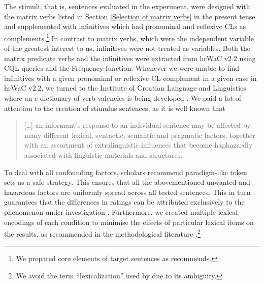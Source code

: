 The stimuli, that is, sentences evaluated in the experiment, were designed with the matrix verbs listed in Section \ref{Selection of matrix verbs} in the present tense and supplemented with infinitives which had pronominal and reflexive CLs as complements.\footnote{We prepared core elements of target sentences as \citet[][50]{Cowart97} recommends. } In contrast to matrix verbs, which were the independent variable of the greatest interest to us, infinitives were not treated as variables. Both the matrix predicate verbs and the infinitives were extracted from hrWaC v2.2 using CQL queries and the Frequency function. Whenever we were unable to find infinitives with a given pronominal or reflexive CL complement in a given case in hrWaC v2.2, we turned to the Institute of Croatian Language and Linguistics where an e-dictionary of verb valencies is being developed \citep[cf.][]{BBR17}. We paid a lot of attention to the creation of stimulus sentences, as it is well known that

\begin{quotation}
[\dots] an informant’s response to an individual sentence may be affected by many different lexical, syntactic, semantic and pragmatic factors, together with an assortment of extralinguistic influences that become haphazardly associated with linguistic materials and structures. \hfill \citep[][46]{Cowart97}
\end{quotation}


To deal with all confounding factors, scholars recommend paradigm-like token sets as a safe strategy. This ensures that all the abovementioned unwanted and hazardous factors are uniformly spread across all tested sentences. This in turn guarantees that the differences in ratings can be attributed exclusively to the phenomenon under investigation \citep[][13, 47, 52]{Cowart97}. Furthermore, we created multiple lexical encodings of each condition to minimise the effects of particular lexical items on the results, as recommended in the methodological literature \citep[cf.][39]{SchutzeSprouse13}.\footnote{We avoid the term “lexicalization” used by \citet[][39]{SchutzeSprouse13} due to its ambiguity.}


